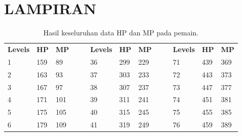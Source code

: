 \chapter*{LAMPIRAN}
\vspace{4ex}
\label{chap:chap6_attachment}

\begin{table}[!h]
	\centering
	\caption{Hasil keseluruhan data HP dan MP pada pemain.}
	\label{tb:player_hp_mp_all}
	\begin{tabular}{|l|l|l|ll|l|l|l|lllll}
		\cline{1-3} \cline{6-8} \cline{11-13}
		\multicolumn{1}{|c|}{\cellcolor[HTML]{C0C0C0}\textbf{Levels}} & \multicolumn{1}{c|}{\cellcolor[HTML]{C0C0C0}\textbf{HP}} & \multicolumn{1}{c|}{\cellcolor[HTML]{C0C0C0}\textbf{MP}} & \multicolumn{1}{c}{} & \multicolumn{1}{c|}{} & \multicolumn{1}{c|}{\cellcolor[HTML]{C0C0C0}\textbf{Levels}} & \multicolumn{1}{c|}{\cellcolor[HTML]{C0C0C0}\textbf{HP}} & \multicolumn{1}{c|}{\cellcolor[HTML]{C0C0C0}\textbf{MP}} & \multicolumn{1}{c}{} & \multicolumn{1}{c|}{} & \multicolumn{1}{c|}{\cellcolor[HTML]{C0C0C0}\textbf{Levels}} & \multicolumn{1}{c|}{\cellcolor[HTML]{C0C0C0}\textbf{HP}} & \multicolumn{1}{c|}{\cellcolor[HTML]{C0C0C0}\textbf{MP}} \\ \cline{1-3} \cline{6-8} \cline{11-13} 
		1 & 159 & 89 &  &  & 36 & 299 & 229 &  & \multicolumn{1}{l|}{} & \multicolumn{1}{l|}{71} & \multicolumn{1}{l|}{439} & \multicolumn{1}{l|}{369} \\ \cline{1-3} \cline{6-8} \cline{11-13} 
		2 & 163 & 93 &  &  & 37 & 303 & 233 &  & \multicolumn{1}{l|}{} & \multicolumn{1}{l|}{72} & \multicolumn{1}{l|}{443} & \multicolumn{1}{l|}{373} \\ \cline{1-3} \cline{6-8} \cline{11-13} 
		3 & 167 & 97 &  &  & 38 & 307 & 237 &  & \multicolumn{1}{l|}{} & \multicolumn{1}{l|}{73} & \multicolumn{1}{l|}{447} & \multicolumn{1}{l|}{377} \\ \cline{1-3} \cline{6-8} \cline{11-13} 
		4 & 171 & 101 &  &  & 39 & 311 & 241 &  & \multicolumn{1}{l|}{} & \multicolumn{1}{l|}{74} & \multicolumn{1}{l|}{451} & \multicolumn{1}{l|}{381} \\ \cline{1-3} \cline{6-8} \cline{11-13} 
		5 & 175 & 105 &  &  & 40 & 315 & 245 &  & \multicolumn{1}{l|}{} & \multicolumn{1}{l|}{75} & \multicolumn{1}{l|}{455} & \multicolumn{1}{l|}{385} \\ \cline{1-3} \cline{6-8} \cline{11-13} 
		6 & 179 & 109 &  &  & 41 & 319 & 249 &  & \multicolumn{1}{l|}{} & \multicolumn{1}{l|}{76} & \multicolumn{1}{l|}{459} & \multicolumn{1}{l|}{389} \\ \cline{1-3} \cline{6-8} \cline{11-13} 

\end{tabular}
\end{table}

